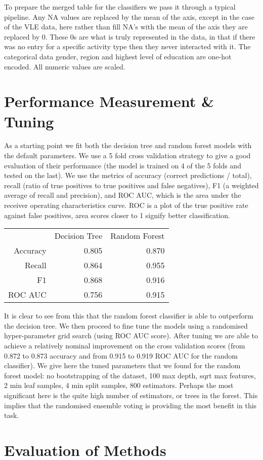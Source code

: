 \documentclass[11pt,a4paper]{article}
\begin{document}
To prepare the merged table for the classifiers we pass it through a typical pipeline. Any NA values are replaced by the mean of the axis, except in the case of the VLE data, here rather than fill NA's with the mean of the axis they are replaced by 0. These 0s are what is truly represented in the data, in that if there was no entry for a specific activity type then they never interacted with it. The categorical data gender, region and highest level of education are one-hot encoded. All numeric values are scaled.

\section{Performance Measurement \& Tuning}

As a starting point we fit both the decision tree and random forest models with the default parameters. We use a 5 fold cross validation strategy to give a good evaluation of their performance (the model is trained on 4 of the 5 folds and tested on the last). We use the metrics of accuracy (correct predictions / total),  recall (ratio of true positives to true positives and false negatives), F1 (a weighted average of recall and precision), and ROC AUC, which is the area under the receiver operating characteristics curve. ROC is a plot of the true positive rate against false positives, area scores closer to 1 signify better classification. 

\begin{center}
\begin{tabular}{ rrr } 
& Decision Tree & Random Forest \\ 
 Accuracy & 0.805 & 0.870 \\ 
 Recall & 0.864 & 0.955 \\
 F1 & 0.868 & 0.916 \\
 ROC AUC & 0.756 & 0.915
\end{tabular}
\end{center}

It is clear to see from this that the random forest classifier is able to outperform the decision tree. We then proceed to fine tune the models using a randomised hyper-parameter grid search (using ROC AUC score). After tuning we are able to achieve a relatively nominal improvement on the cross validation scores (from 0.872 to 0.873 accuracy and from 0.915 to 0.919 ROC AUC for the random classifier). We give here the tuned parameters that we found for the random forest model: no bootstrapping of the dataset, 100 max depth, sqrt max features, 2 min leaf samples, 4 min split samples, 800 estimators. Perhaps the most significant here is the quite high number of estimators, or trees in the forest. This implies that the randomised ensemble voting is providing the most benefit in this task.

\section{Evaluation of Methods}

\printbibliography[]
\end{document}
